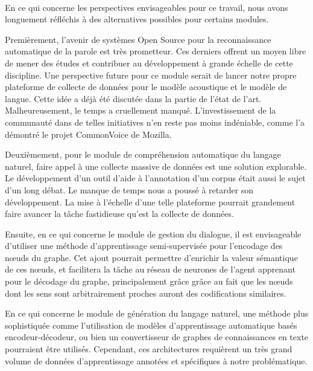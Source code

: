 \paragraph{}
En ce qui concerne les perspectives envisageables pour ce travail, nous avons longuement réfléchis à des alternatives possibles pour certains modules.
\par
Premièrement, l'avenir de systèmes Open Source pour la reconnaissance automatique de la parole est très prometteur. Ces derniers offrent un moyen libre de mener des études et contribuer au développement à grande échelle de cette discipline. Une perspective future pour ce module serait de lancer notre propre plateforme de collecte de données pour le modèle acoustique et le modèle de langue. Cette idée a déjà été discutée dans la partie de l'état de l'art. Malheureusement, le temps a cruellement manqué. L'investissement de la communauté dans de telles initiatives n'en reste pas moins indéniable, comme l'a démontré le projet CommonVoice de Mozilla.
\par
Deuxièmement, pour le module de compréhension automatique du langage naturel, faire appel à une collecte massive de données est une solution explorable. Le développement d'un outil d'aide à l'annotation d'un corpus était aussi le sujet d'un long débat. Le manque de temps nous a poussé à retarder son développement. La mise à l'échelle d'une telle plateforme pourrait grandement faire avancer la tâche fastidieuse qu'est la collecte de données. 
\par 

Ensuite, en ce qui concerne le module de gestion du dialogue, il est envisageable d'utiliser une méthode d'apprentissage semi-supervisée pour l'encodage des n\oe{}uds du graphe. Cet ajout pourrait permettre d'enrichir la valeur sémantique de ces n\oe{}uds, et facilitera la tâche au réseau de neurones de l'agent apprenant pour le décodage du graphe, principalement grâce grâce au fait que les n\oe{}uds dont les sens sont arbitrairement proches auront des codifications similaires.

\par
En ce qui concerne le module de génération du langage naturel, une méthode plus sophistiquée comme l'utilisation de modèles d'apprentissage automatique basés encodeur-décodeur, ou bien un convertisseur de graphes de connaissances en texte pourraient être utilisés. Cependant, ces architectures requièrent un très grand volume de données d'apprentissage annotées et spécifiques à notre problématique.

